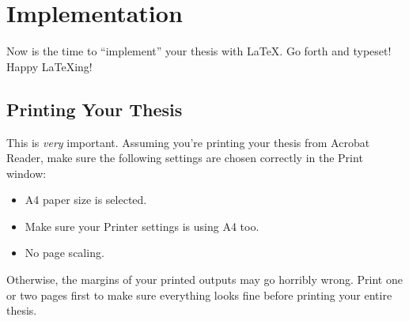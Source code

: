 \chapter{Implementation}\label{chap:implementation}

Now is the time to ``implement'' your thesis with \LaTeX.  Go forth and typeset! Happy \LaTeX{}ing! \Smiley

\section{Printing Your Thesis}
This is \emph{very} important. Assuming you're printing your thesis from Acrobat Reader, make sure the following settings are chosen correctly in the Print window:

\begin{itemize}[nosep]
\item A4 paper size is selected.
\item Make sure your Printer settings is using A4 too.
\item No page scaling.
\end{itemize}

Otherwise, the margins of your printed outputs may go horribly wrong. Print one or two pages first to make sure everything looks fine before printing your entire thesis.